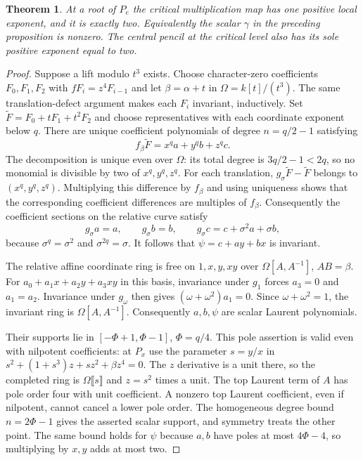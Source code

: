 \documentclass[11pt,a4paper,reqno]{amsart}
\numberwithin{equation}{section}
\theoremstyle{plain}
\newtheorem{theorem}{Theorem}[section]
\theoremstyle{definition}
\theoremstyle{remark}
\begin{document}
\begin{theorem}\label{thm:critical-order}
At a root of $P_e$ the critical multiplication map has one positive local exponent,
and it is exactly two. Equivalently the scalar $\gamma$ in the preceding proposition
is nonzero. The central pencil at the critical level also has its sole positive
exponent equal to two.
\end{theorem}
\begin{proof}
Suppose a lift modulo $t^3$ exists. Choose character-zero coefficients $F_0,F_1,F_2$ with
$fF_i=z^4F_{i-1}$ and let $\beta=\alpha+t$ in $\Omega=k[t]/(t^3)$. The same
translation-defect argument makes each $F_i$ invariant, inductively. Set $\widetilde
F=F_0+tF_1+t^2F_2$ and choose representatives with each coordinate exponent below
$q$. There are unique coefficient polynomials of degree $n=q/2-1$ satisfying
\[
f_\beta \widetilde F=x^qa+y^qb+z^qc.
\]
The decomposition is unique even over $\Omega$: its total degree is
$3q/2-1<2q$, so no monomial is divisible by two of $x^q,y^q,z^q$.
For each translation, $g_\sigma\widetilde F-\widetilde F$ belongs
to $(x^q,y^q,z^q)$. Multiplying this difference by $f_\beta$ and
using uniqueness shows that the corresponding coefficient differences
are multiples of $f_\beta$.
Consequently the coefficient sections on the relative curve satisfy
\[
g_\sigma a=a,\qquad g_\sigma b=b,\qquad
g_\sigma c=c+\sigma^2a+\sigma b,
\]
because $\sigma^q=\sigma^2$ and $\sigma^{2q}=\sigma$.
It follows that $\psi=c+ay+bx$ is invariant.

The relative affine coordinate ring is free on $1,x,y,xy$ over $\Omega[A,A^{-1}]$,
$AB=\beta$. For $a_0+a_1x+a_2y+a_3xy$ in this basis, invariance under
$g_1$ forces $a_3=0$ and $a_1=a_2$. Invariance under $g_\omega$
then gives $(\omega+\omega^2)a_1=0$. Since $\omega+\omega^2=1$,
the invariant ring is $\Omega[A,A^{-1}]$. Consequently $a,b,\psi$ are
scalar Laurent polynomials.

Their supports lie in $[-\Phi+1,\Phi-1]$, $\Phi=q/4$. This pole assertion is valid
even with nilpotent coefficients: at $P_x$ use the parameter $s=y/x$ in
$s^2+(1+s^3)z+sz^2+\beta z^4=0$. The $z$ derivative is a unit there, so the completed
ring is $\Omega\llbracket s\rrbracket$ and $z=s^2$ times a unit. The top Laurent term
of $A$ has pole order four with unit coefficient. A nonzero top Laurent coefficient,
even if nilpotent, cannot cancel a lower pole order. The homogeneous degree bound
$n=2\Phi-1$ gives the asserted scalar support, and symmetry treats the other point.
The same bound holds for $\psi$ because $a,b$ have poles at most $4\Phi-4$, so
multiplying by $x,y$ adds at most two.


\end{proof}
\end{document}
